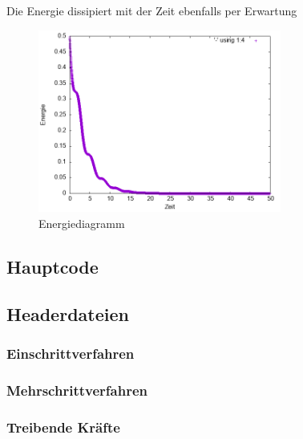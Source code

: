 \documentclass[
    oneside,
    ngerman,
    footinclude=false,
    captions=tableheading,
    DIV=12
]{scrartcl}
\begin{document}
            Die Energie dissipiert mit der Zeit ebenfalls per Erwartung
            \begin{figure}[H]
                \centering
                \includegraphics[width=8cm]{Bilddateien/VVA1(b)-001-0.3-E.png}
                \caption{Energiediagramm}
            \end{figure}


        \subaufgabe{}

        \subaufgabe{}

        \subaufgabe{}
            

    \newpage
    \subsection*{Hauptcode}
        

    \subsection*{Headerdateien}
        \subsubsection*{Einschrittverfahren}
            

        \subsubsection*{Mehrschrittverfahren}
            

        \subsubsection*{Treibende Kräfte}
            
\end{document}
